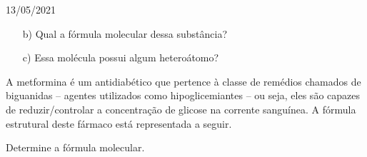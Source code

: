 \documentclass{SchoolBook}
\begin{document}
\begin{day}{13/05/2021}
\begin{enumerate}
            \item[b)] Qual a fórmula molecular dessa substância?
            
            \item[c)] Essa molécula possui algum heteroátomo? 
        \end{enumerate}
        
        A metformina é um antidiabético que pertence à classe de remédios chamados de biguanidas -- agentes utilizados como hipoglicemiantes -- ou seja, eles são capazes de reduzir/controlar a concentração de glicose na corrente sanguínea. A fórmula estrutural deste fármaco está representada a seguir.
        
        \vspace{12pt}
        \vspace{12pt}
        
        \noindent Determine a fórmula molecular.
    \end{day}
    
\end{document}
